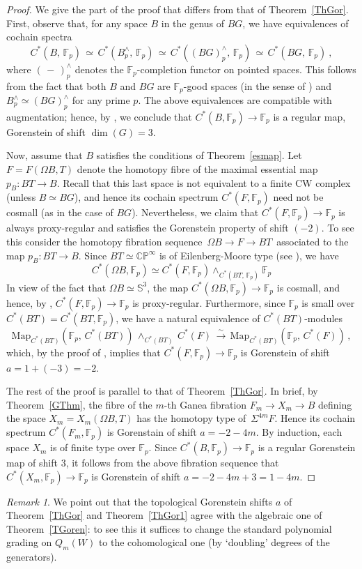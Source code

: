 \documentclass[11pt]{amsart}
\theoremstyle{definition}
\theoremstyle{remark}
\newtheorem{remark}[theorem]{Remark}
\numberwithin{equation}{section}
\newcommand{\la}{\label}
\newcommand{\Map}{\mathrm{Map}}
\def\bS{\mathbb S}
\def\bP{\mathbb P}
\def\C{\mathbb C}
\def\F{\mathbb F}
\begin{document}
\begin{proof}
We give the part of the proof that differs from that of Theorem~\ref{ThGor}. First, observe that, for any space $B$ in the genus of $BG$, we have equivalences of cochain spectra
%
$$
C^*(B,\, \F_p)\, \simeq\, C^*(B^{\wedge}_p,\, \F_p)
\,\simeq\, C^*((BG)^{\wedge}_p,\, \F_p) \,\simeq\,
C^*(BG,\,\F_p)\ ,
$$
%
where $ (\,-\,)^{\wedge}_p $ denotes the $ \F_p$-completion functor on pointed spaces. This follows from the fact that both $B$ and $BG$ are $\F_p$-good spaces (in the sense of \cite{Bou75}) and $ B^{\wedge}_p \simeq (BG)^{\wedge}_p $ for any prime $p$. The above equivalences are compatible with augmentation; hence, by \cite[10.2]{DGI06}, we conclude that $ C^*(B, \F_p) \to \F_p $ is a regular map, Gorenstein of shift $ \dim(G) = 3 $. 

Now, assume that $B$ satisfies the conditions of Theorem~\ref{esmap}. Let $ F = F(\Omega B, T)$ denote the homotopy fibre of the maximal essential map $ p_B: BT \to B $. Recall that this last space is not equivalent to a finite CW complex (unless $ B \simeq BG $), and hence its cochain spectrum $C^*(F, \F_p) $ need not be cosmall (as in the case of $BG$). Nevertheless, we claim that $C^*(F, \F_p) \to \F_p $ is always proxy-regular and satisfies the Gorenstein property of shift $ (-2)$. To see this consider the homotopy fibration sequence $\,\Omega B \to F \to BT \,$ associated to the map $ p_B: BT \to B $. 
Since $ BT \simeq \C\bP^\infty $ is of Eilenberg-Moore type (see \cite[4.22]{DGI06}), we have
%
$$
C^*(\Omega B, \F_p) \simeq C^*(F, \F_p) \wedge_{C^*(BT, \,\F_p)} \F_p 
$$
%
In view of the fact that $ \Omega B \simeq \bS^3 $, the map $C^*(\Omega B, \F_p)\to \F_p$ is cosmall, and
hence, by \cite[Prop. 4.18]{DGI06},   $C^*(F, \F_p) \to \F_p $ is proxy-regular. Furthermore, since  $\F_p $ is small over $ C^*(BT) = C^*(BT, \F_p)$, we have a natural equivalence of $C^*(BT)$-modules
%
$$
\Map_{C^*(BT)}(\F_p,\,C^*(BT))\,\wedge_{C^*(BT)}\,C^*(F)\,\xrightarrow{\sim}\,
\Map_{C^*(BT)}(\F_p,\,C^*(F))\,,
$$
%
which, by the proof of \cite[Prop. 8.6]{DGI06}, implies that $ C^*(F, \F_p) \to \F_p$ is Gorenstein of shift
$a = 1 + (-3) = -2$. 

The rest of the proof is parallel to that of Theorem~\ref{ThGor}. In brief, by Theorem~\ref{GThm}, 
the fibre of the $m$-th Ganea fibration $ F_m \to X_m \to B $ defining the space $ X_m = X_m(\Omega B, T)$
has the homotopy type of $\, \Sigma^{4m} F $. Hence its cochain spectrum $ C^*(F_m, \F_p)  $ is
Gorenstain of shift $ a = - 2 - 4m$. By induction, each space $X_m$ is of finite type over $\F_p$.
Since $ C^*(B, \F_p) \to \F_p $ is a regular Gorenstein map of shift $ 3 $, it follows from the above fibration sequence that $C^*(X_m, \F_p) \to \F_p $ is Gorenstein of shift $ a = -2 -4m + 3 = 1-4m$. 
 \end{proof}
%
\begin{remark}
\la{shiftpar}
We point out that the topological Gorenstein shifts $ a $ of Theorem~\ref{ThGor} and Theorem~\ref{ThGor1} agree with the algebraic one of Theorem~\ref{TGoren}: to see this it suffices to change the standard polynomial grading on $ Q_m(W) $ to the cohomological one (by `doubling' degrees of the generators).
\end{remark}
%
\end{document}
